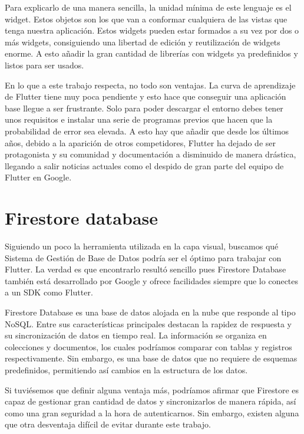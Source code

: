 	Para explicarlo de una manera sencilla, la unidad mínima de este lenguaje es el widget. Estos objetos son los que van a conformar cualquiera de las vistas que tenga nuestra aplicación. Estos widgets pueden estar formados a su vez por dos o más widgets, consiguiendo una libertad de edición y reutilización de widgets enorme. A esto añadir la gran cantidad de librerías con widgets ya predefinidos y listos para ser usados.
	
	En lo que a este trabajo respecta, no todo son ventajas. La curva de aprendizaje de Flutter tiene muy poca pendiente y esto hace que conseguir una aplicación base llegue a ser frustrante. Solo para poder descargar el entorno debes tener unos requisitos e instalar una serie de programas previos que hacen que la probabilidad de error sea elevada. A esto hay que añadir que desde los últimos años, debido a la aparición de otros competidores, Flutter ha dejado de ser protagonista y su comunidad y documentación a disminuido de manera drástica, llegando a salir noticias actuales como el despido de gran parte del equipo de Flutter en Google.
	
	
\section{Firestore database}

	Siguiendo un poco la herramienta utilizada en la capa visual, buscamos qué Sistema de Gestión de Base de Datos podría ser el óptimo para trabajar con Flutter. La verdad es que encontrarlo resultó sencillo pues Firestore Database también está desarrollado por Google y ofrece facilidades siempre que lo conectes a un SDK como Flutter.
	
	Firestore Database es una base de datos alojada en la nube que responde al tipo NoSQL. Entre sus características principales destacan la rapidez de respuesta y su sincronización de datos en tiempo real. La información se organiza en colecciones y documentos, los cuales podríamos comparar con tablas y registros respectivamente. Sin embargo, es una base de datos que no requiere de esquemas predefinidos, permitiendo así cambios en la estructura de los datos.
	
	Si tuviésemos que definir alguna ventaja más, podríamos afirmar que Firestore es capaz de gestionar gran cantidad de datos y sincronizarlos de manera rápida, así como una gran seguridad a la hora de autenticarnos. Sin embargo, existen alguna que otra desventaja difícil de evitar durante este trabajo.
	
